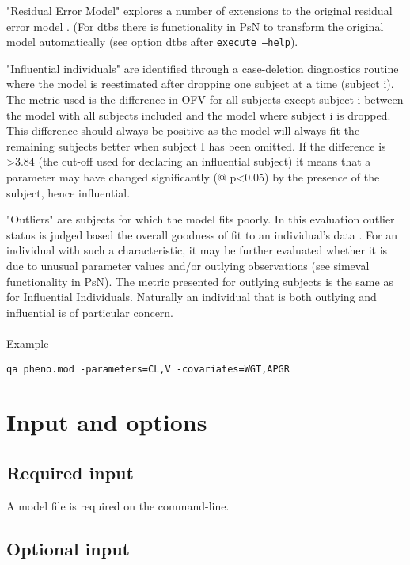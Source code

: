 "Residual Error Model" explores a number of extensions to the original residual error model \cite{Ibrahim, Karlsson2, Karlsson3, Dosne2012}. (For dtbs there is functionality in PsN to transform the original model automatically (see option dtbs after \verb|execute –help|). 

"Influential individuals" are identified through a case-deletion diagnostics routine where the model is reestimated after dropping one subject at a time (subject i). The metric used is the difference in OFV for all subjects except subject i between the model with all subjects included and the model where subject i is dropped. This difference should always be positive as the model will always fit the remaining subjects better when subject I has been omitted. If the difference is >3.84 (the cut-off used for declaring an influential subject) it means that a parameter may have changed significantly (@ p<0.05) by the presence of the subject, hence influential.

"Outliers" are subjects for which the model fits poorly. In this evaluation outlier status is judged based the overall goodness of fit to an individual's data \cite{Largajolli}. For an individual with such a characteristic, it may be further evaluated whether it is due to unusual parameter values and/or outlying observations (see simeval functionality in PsN). The metric presented for outlying subjects is the same as for Influential Individuals. Naturally an individual that is both outlying and influential is of particular concern.
\\
\\
Example
\begin{verbatim}
qa pheno.mod -parameters=CL,V -covariates=WGT,APGR
\end{verbatim}

\section{Input and options}

\subsection{Required input}
A model file is required on the command-line.



\subsection{Optional input}



